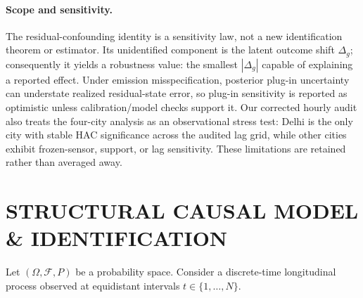 \documentclass[twoside]{article}
\theoremstyle{definition}
\begin{document}
\paragraph{Scope and sensitivity.} The residual-confounding identity is a sensitivity law, not a new identification theorem or estimator. Its unidentified component is the latent outcome shift $\Delta_g$; consequently it yields a robustness value: the smallest $|\Delta_g|$ capable of explaining a reported effect. Under emission misspecification, posterior plug-in uncertainty can understate realized residual-state error, so plug-in sensitivity is reported as optimistic unless calibration/model checks support it. Our corrected hourly audit also treats the four-city analysis as an observational stress test: Delhi is the only city with stable HAC significance across the audited lag grid, while other cities exhibit frozen-sensor, support, or lag sensitivity. These limitations are retained rather than averaged away.

\section{STRUCTURAL CAUSAL MODEL \& IDENTIFICATION}
\label{sec:setup}

Let $(\Omega, \mathcal{F}, P)$ be a probability space. Consider a discrete-time longitudinal process observed at equidistant intervals $t \in \{1, \dots, N\}$.
\end{document}
